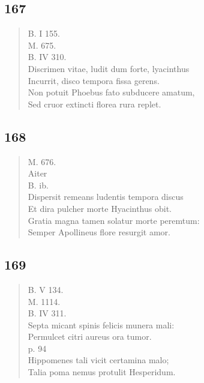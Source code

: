 \documentclass[11pt, a4paper]{report}
\begin{document}
            \subsection*{167}
      \begin{verse}
      B. I 155. \\ M. 675. \\ B. IV 310. \\ Discrimen vitae, ludit dum forte, lyacinthus \\ Incurrit, disco tempora fissa gerens. \\ Non potuit Phoebus fato subducere amatum, \\ Sed cruor extincti florea rura replet. \\ 
      \end{verse}
  
            \subsection*{168}
      \begin{verse}
      M. 676. \\  \lbrack Aiter \rbrack  \\ B. ib. \\ Dispersit remeans ludentis tempora discus \\ Et dira pulcher morte Hyacinthus obit. \\ Gratia magna tamen solatur morte peremtum: \\ Semper Apollineus flore resurgit amor. \\ 
      \end{verse}
  
            \subsection*{169}
      \begin{verse}
      B. V 134. \\ M. 1114. \\ B. IV 311. \\ Septa micant spinis felicis munera mali: \\ Permulcet citri aureus ora tumor. \\ p. 94 \\ Hippomenes tali vicit certamina malo; \\ Talia poma nemus protulit Hesperidum. \\ 
      \end{verse}
  
\end{document}
